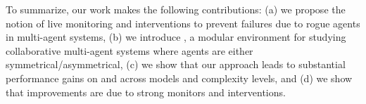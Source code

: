 To summarize, our work makes the following contributions: (a) we propose the notion of live monitoring and interventions to prevent failures due to rogue agents in multi-agent systems, (b) we introduce \ourenv{}, a modular environment for studying collaborative multi-agent systems where agents are either symmetrical/asymmetrical, (c) we show that our approach leads to substantial performance gains on \ourenv{} and \govsim{} across models and complexity levels, and (d) we show that improvements are due to strong monitors and interventions.






